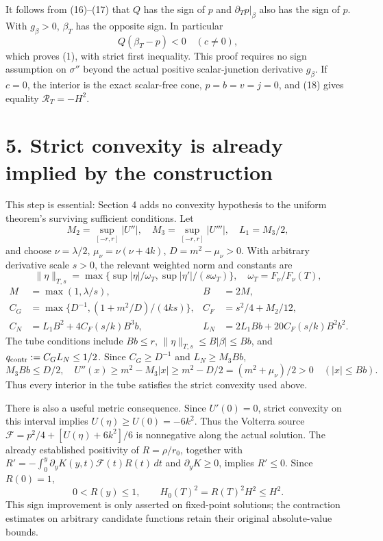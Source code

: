 \documentclass[11pt]{article}
\begin{document}
It follows from (16)--(17) that \(Q\) has the sign of \(p\) and
\(\partial_Tp\vert_\beta\) also has the sign of \(p\). With \(g_\beta>0\),
\(\beta_T\) has the opposite sign. In particular
\[
 Q(\beta_T-p)<0\quad(c\ne0),
\]
which proves (1), with strict first inequality. This proof requires no sign
assumption on \(\sigma''\) beyond the actual positive scalar-junction
derivative \(g_\beta\). If \(c=0\), the interior is the exact scalar-free cone,
\(p=b=v=j=0\), and (18) gives equality \(\mathscr R_T=-H^2\).

\section{5. Strict convexity is already implied by the construction}\label{strict-convexity-is-already-implied-by-the-construction}

This step is essential: Section 4 adds no convexity hypothesis to the uniform
theorem's surviving sufficient conditions. Let
\[
 M_2=\sup_{[-r,r]}|U''|,\quad M_3=\sup_{[-r,r]}|U'''|,
 \quad L_1=M_3/2,
\]
and choose \(\nu=\lambda/2\), \(\mu_\nu=\nu(\nu+4k)\),
\(D=m^2-\mu_\nu>0\). With arbitrary derivative scale \(s>0\), the relevant
weighted norm and constants are
\[
 \|\eta\|_{T,s}=
 \max\{\sup|\eta|/\omega_T,\sup|\eta'|/(s\omega_T)\},
 \quad \omega_T=F_\nu/F_\nu(T),
\]
\[
 \begin{aligned}
 M&=\max(1,\lambda/s),&B&=2M,\\
 C_G&=\max\{D^{-1},(1+m^2/D)/(4ks)\},&
 C_F&=s^2/4+M_2/12,\\
 C_N&=L_1B^2+4C_F(s/k)B^3b,&
 L_N&=2L_1Bb+20C_F(s/k)B^2b^2.
 \end{aligned}                                    \tag{20}
\]
The tube conditions include \(Bb\leq r\),
\(\|\eta\|_{T,s}\leq B|\beta|\leq Bb\), and
\(q_{\rm contr}:=C_G L_N\leq1/2\). Since
\(C_G\geq D^{-1}\) and \(L_N\geq M_3Bb\),
\[
 M_3Bb\leq D/2,
 \quad
 U''(x)\geq m^2-M_3|x|
      \geq m^2-D/2=(m^2+\mu_\nu)/2>0
 \quad (|x|\leq Bb).                              \tag{21}
\]
Thus every interior in the tube satisfies the strict convexity used above.

There is also a useful metric consequence. Since \(U'(0)=0\), strict
convexity on this interval implies \(U(\eta)\geq U(0)=-6k^2\).
Thus the Volterra source
\(\mathcal F=p^2/4+[U(\eta)+6k^2]/6\) is nonnegative along the actual
solution. The already established positivity of \(R=\rho/r_0\), together
with \(R'=-\int_0^y\partial_yK(y,t)\mathcal F(t)R(t)\,dt\) and
\(\partial_yK\geq0\), implies \(R'\leq0\). Since \(R(0)=1\),
\[
 0<R(y)\leq1,\qquad H_0(T)^2=R(T)^2H^2\leq H^2.   \tag{21a}
\]
This sign improvement is only asserted on fixed-point solutions; the
contraction estimates on arbitrary candidate functions retain their original
absolute-value bounds.
\end{document}
